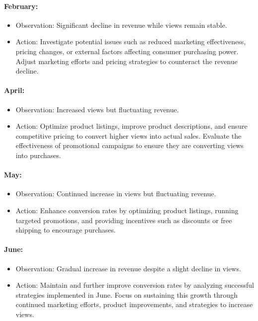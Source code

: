 \documentclass[
]{article}
\providecommand{\tightlist}{%
  \setlength{\itemsep}{0pt}\setlength{\parskip}{0pt}}
\begin{document}
\paragraph{February:}\label{february}

\begin{itemize}
\tightlist
\item
  Observation: Significant decline in revenue while views remain stable.
\item
  Action: Investigate potential issues such as reduced marketing
  effectiveness, pricing changes, or external factors affecting consumer
  purchasing power. Adjust marketing efforts and pricing strategies to
  counteract the revenue decline.
\end{itemize}

\paragraph{April:}\label{april}

\begin{itemize}
\tightlist
\item
  Observation: Increased views but fluctuating revenue.
\item
  Action: Optimize product listings, improve product descriptions, and
  ensure competitive pricing to convert higher views into actual sales.
  Evaluate the effectiveness of promotional campaigns to ensure they are
  converting views into purchases.
\end{itemize}

\paragraph{May:}\label{may}

\begin{itemize}
\tightlist
\item
  Observation: Continued increase in views but fluctuating revenue.
\item
  Action: Enhance conversion rates by optimizing product listings,
  running targeted promotions, and providing incentives such as
  discounts or free shipping to encourage purchases.
\end{itemize}

\paragraph{June:}\label{june}

\begin{itemize}
\tightlist
\item
  Observation: Gradual increase in revenue despite a slight decline in
  views.
\item
  Action: Maintain and further improve conversion rates by analyzing
  successful strategies implemented in June. Focus on sustaining this
  growth through continued marketing efforts, product improvements, and
  strategies to increase views.
\end{itemize}
\end{document}

